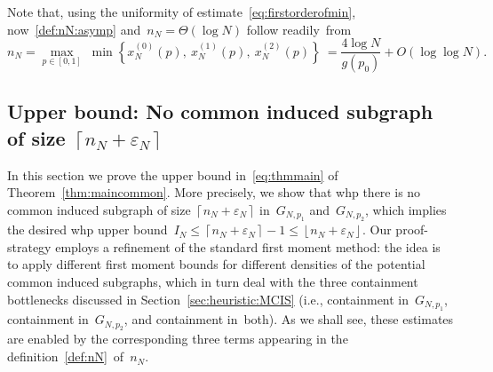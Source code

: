 \documentclass{article}
\newcommand{\eps}{\varepsilon}
\newcommand\floor[1]{\left\lfloor #1 \right \rfloor}
\newcommand\ceil[1]{\left\lceil #1 \right \rceil}
\newcommand{\xone}{x^{(1)}}
\newcommand{\xtwo}{x^{(2)}}
\newcommand{\xot}{x^{(0)}}
\newcommand{\nN}{n_N}
\begin{document}
Note that, using the uniformity of estimate~\eqref{eq:firstorderofmin}, now~\eqref{def:nN:asymp} and~$n_N = \Theta(\log N)$ follow readily~from 
\begin{equation}\label{eq:firstorderonN}
    n_N =\max_{p\in [0,1]} \; \min\left\{\xot_N(p), \: \xone_N(p), \: \xtwo_N(p) \right\} \
    = \frac{ 4\log N}{g(p_0)} + O(\log\log N) . 
\end{equation}




\subsection{Upper bound: No common induced subgraph of size $\ceil{\nN+\eps_N}$} \label{sec:commonfirst}
In this section we prove the upper bound in~\eqref{eq:thmmain} of Theorem~\ref{thm:maincommon}.
More precisely, we show that whp there is no common induced subgraph of size $\ceil{\nN+\eps_N}$ in~$G_{N,p_1}$ and~$G_{N,p_2}$, 
which implies the desired whp upper bound~$I_N \le \ceil{\nN+\eps_N}-1 \le  \floor{\nN+\eps_N}$. 
Our proof-strategy employs a refinement of the standard first moment method: the idea is to apply different first moment bounds
for different densities of the potential common induced subgraphs, 
which in turn deal with the three containment bottlenecks discussed in Section~\ref{sec:heuristic:MCIS} (i.e., containment in~$G_{N,p_1}$, containment in~$G_{N,p_2}$, and containment in~both). 
As we shall see, these estimates are enabled by the corresponding three terms appearing in the definition~\eqref{def:nN}~of~$n_N$.
\end{document}
